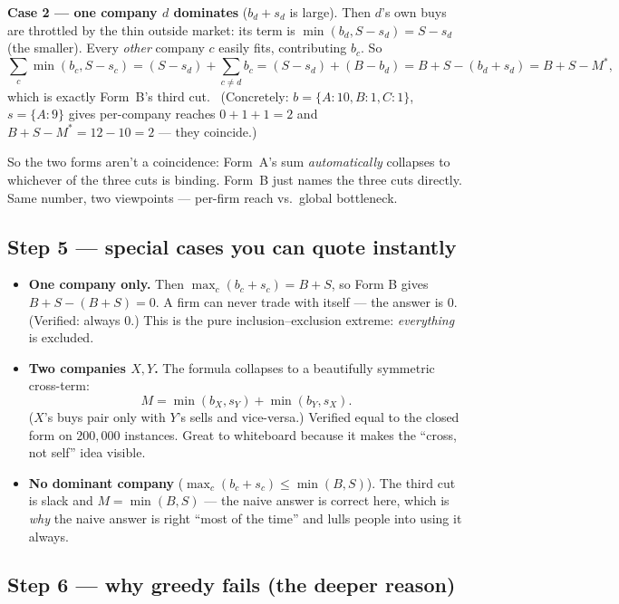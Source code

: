 \textbf{Case 2 --- one company $d$ dominates} ($b_d+s_d$ is large). Then $d$'s own
buys are throttled by the thin outside market: its term is $\min(b_d,S-s_d)=S-s_d$
(the smaller). Every \emph{other} company $c$ easily fits, contributing $b_c$. So
\[
\textstyle\sum_c\min(b_c,S-s_c)=(S-s_d)+\sum_{c\neq d}b_c=(S-s_d)+(B-b_d)=B+S-(b_d+s_d)=B+S-M^\ast,
\]
which is exactly Form~B's third cut. \checkmark\ (Concretely: $b{=}\{A{:}10,B{:}1,C{:}1\}$,
$s{=}\{A{:}9\}$ gives per-company reaches $0{+}1{+}1=2$ and $B{+}S{-}M^\ast=12{-}10=2$ ---
they coincide.)

\begin{intu}
So the two forms aren't a coincidence: Form~A's sum \emph{automatically} collapses
to whichever of the three cuts is binding. Form~B just names the three cuts
directly. Same number, two viewpoints --- per-firm reach vs.\ global bottleneck.
\end{intu}

\subsection{Step 5 --- special cases you can quote instantly}

\begin{itemize}[leftmargin=1.5em]
  \item \textbf{One company only.} Then $\max_c(b_c+s_c)=B+S$, so Form B gives
        $B+S-(B+S)=0$. A firm can never trade with itself --- the answer is $0$.
        (Verified: always $0$.) This is the pure inclusion--exclusion extreme:
        \emph{everything} is excluded.
  \item \textbf{Two companies $X,Y$.} The formula collapses to a beautifully
        symmetric cross-term:
        \[
        M=\min(b_X,s_Y)+\min(b_Y,s_X).
        \]
        ($X$'s buys pair only with $Y$'s sells and vice-versa.) Verified equal to
        the closed form on $200{,}000$ instances. Great to whiteboard because it
        makes the ``cross, not self'' idea visible.
  \item \textbf{No dominant company} ($\max_c(b_c+s_c)\le\min(B,S)$). The third cut
        is slack and $M=\min(B,S)$ --- the naive answer is correct here, which is
        \emph{why} the naive answer is right ``most of the time'' and lulls people
        into using it always.
\end{itemize}

\subsection{Step 6 --- why greedy fails (the deeper reason)}

